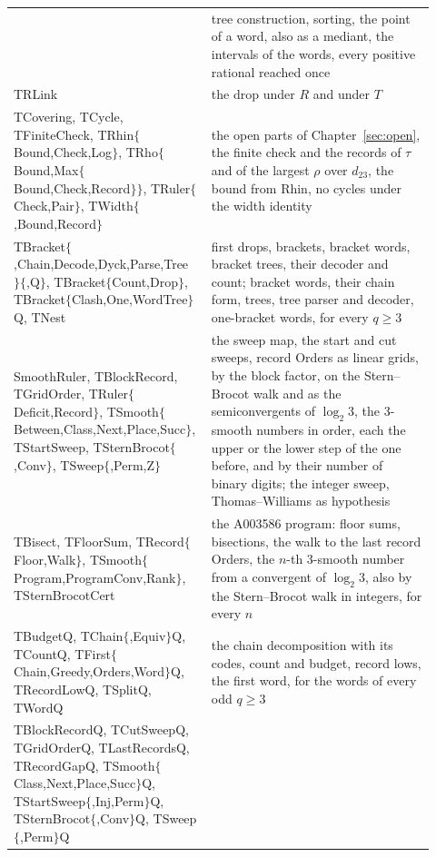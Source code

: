 \documentclass[11pt,a4paper,titlepage]{article}
\newcommand{\lean}[1]{\textsf{#1}}
\begin{document}
\begin{table}[p]
\begin{tabular}{@{}>{\raggedright\arraybackslash}p{0.42\linewidth}>{\raggedright\arraybackslash}p{0.5\linewidth}@{}}
  & tree construction, sorting, the point of a word, also as a mediant, the intervals of the words, every positive rational reached once \\
\lean{TRLink}
  & the drop under $R$ and under $T$ \\
\lean{TCovering}, \lean{TCycle}, \lean{TFiniteCheck}, \lean{TRhin$\{$Bound,Check,Log$\}$}, \lean{TRho$\{$Bound,Max$\{$Bound,Check,Record$\}\}$}, \lean{TRuler$\{$Check,Pair$\}$}, \lean{TWidth$\{$,Bound,Record$\}$}
  & the open parts of Chapter~\ref{sec:open}, the finite check and the records of $\tau$ and of the largest $\rho$ over $d_{23}$, the bound from Rhin, no cycles under the width identity \\
\lean{TBracket$\{$,Chain,Decode,Dyck,Parse,Tree$\}\{$,Q$\}$}, \lean{TBracket$\{$Count,Drop$\}$}, \lean{TBracket$\{$Clash,One,WordTree$\}$Q}, \lean{TNest}
  & first drops, brackets, bracket words, bracket trees, their decoder and count; bracket words, their chain form, trees, tree parser and decoder, one-bracket words, for every $q \ge 3$ \\
\lean{SmoothRuler}, \lean{TBlockRecord}, \lean{TGridOrder}, \lean{TRuler$\{$Deficit,Record$\}$}, \lean{TSmooth$\{$Between,Class,Next,Place,Succ$\}$}, \lean{TStartSweep}, \lean{TSternBrocot$\{$,Conv$\}$}, \lean{TSweep$\{$,Perm,Z$\}$}
  & the sweep map, the start and cut sweeps, record Orders as linear grids, by the block factor, on the Stern--Brocot walk and as the semiconvergents of $\log_2 3$, the $3$-smooth numbers in order, each the upper or the lower step of the one before, and by their number of binary digits; the integer sweep, Thomas--Williams as hypothesis \\
\lean{TBisect}, \lean{TFloorSum}, \lean{TRecord$\{$Floor,Walk$\}$}, \lean{TSmooth$\{$Program,ProgramConv,Rank$\}$}, \lean{TSternBrocotCert}
  & the A003586 program: floor sums, bisections, the walk to the last record Orders, the $n$-th $3$-smooth number from a convergent of $\log_2 3$, also by the Stern--Brocot walk in integers, for every $n$ \\
\lean{TBudgetQ}, \lean{TChain$\{$,Equiv$\}$Q}, \lean{TCountQ}, \lean{TFirst$\{$Chain,Greedy,Orders,Word$\}$Q}, \lean{TRecordLowQ}, \lean{TSplitQ}, \lean{TWordQ}
  & the chain decomposition with its codes, count and budget, record lows, the first word, for the words of every odd $q \ge 3$ \\
\lean{TBlockRecordQ}, \lean{TCutSweepQ}, \lean{TGridOrderQ}, \lean{TLastRecordsQ}, \lean{TRecordGapQ}, \lean{TSmooth$\{$Class,Next,Place,Succ$\}$Q}, \lean{TStartSweep$\{$,Inj,Perm$\}$Q}, \lean{TSternBrocot$\{$,Conv$\}$Q}, \lean{TSweep$\{$,Perm$\}$Q}

\end{tabular}
\end{table}
\end{document}
